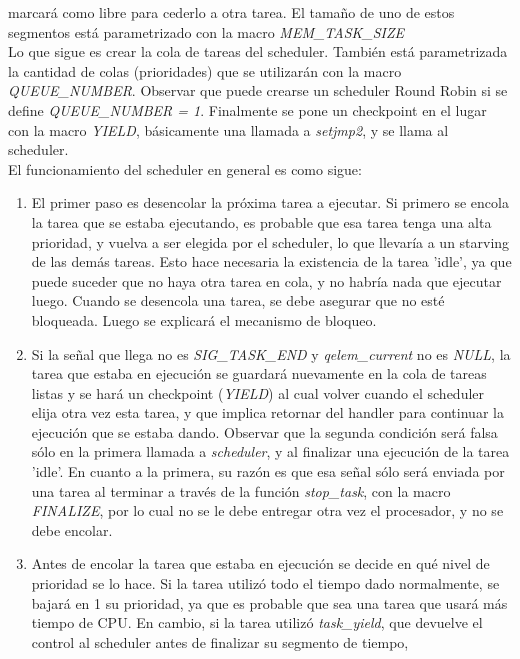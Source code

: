 \documentclass[a4paper]{article}
\begin{document}
marcará como libre para cederlo a otra tarea. El tamaño de uno de
estos segmentos está parametrizado con la macro \textit{MEM\_TASK\_SIZE}\\
Lo que sigue es crear la cola de tareas del scheduler. También está
parametrizada la cantidad de colas (prioridades) que se utilizarán
con la macro \textit{QUEUE\_NUMBER}. Observar que puede crearse un
scheduler Round Robin si se define \textit{QUEUE\_NUMBER = 1}. Finalmente
se pone un checkpoint en el lugar con la macro \textit{YIELD},
básicamente una llamada a \textit{setjmp2}, y se llama al scheduler.\\
El funcionamiento del scheduler en general es como sigue:
\begin{enumerate}
    \item El primer paso es desencolar la pr\'oxima tarea a ejecutar.
    Si primero se encola la tarea que se estaba ejecutando, es probable
    que esa tarea tenga una alta prioridad, y vuelva a ser elegida por
    el scheduler, lo que llevar\'ia a un starving de las dem\'as tareas.
    Esto hace necesaria la existencia de la tarea 'idle', ya que puede
    suceder que no haya otra tarea en cola, y no habr\'ia nada que
    ejecutar luego. Cuando se desencola una tarea, se debe asegurar que
    no est\'e bloqueada. Luego se explicar\'a el mecanismo de bloqueo.
    \item Si la señal que llega no es \textit{SIG\_TASK\_END} y
    \textit{qelem\_current} no es \textit{NULL}, la tarea que estaba
    en ejecución se guardará nuevamente en la cola de tareas listas
    y se hará un checkpoint (\textit{YIELD}) al cual volver cuando
    el scheduler elija otra vez esta tarea, y que implica retornar
    del handler para continuar la ejecución que se estaba dando.
    Observar que la segunda condición será falsa sólo en la primera
    llamada a \textit{scheduler}, y al finalizar una ejecuci\'on de
    la tarea 'idle'. En cuanto a la primera, su razón es
    que esa señal sólo será enviada por una tarea al terminar a
    través de la función \textit{stop\_task}, con la macro
    \textit{FINALIZE}, por lo cual no se le debe entregar otra
    vez el procesador, y no se debe encolar.
    \item Antes de encolar la tarea que estaba en ejecución se decide
    en qué nivel de prioridad se lo hace. Si la tarea utilizó todo
    el tiempo dado normalmente, se bajará en 1 su prioridad, ya que
    es probable que sea una tarea que usará más tiempo de CPU.
    En cambio, si la tarea utilizó \textit{task\_yield}, que devuelve
    el control al scheduler antes de finalizar su segmento de tiempo,

\end{enumerate}
\end{document}
